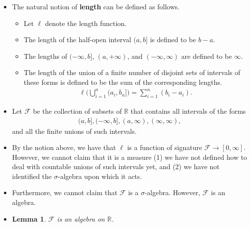 \documentclass[10pt]{article}
\newtheorem{lemma}{Lemma}
\newcommand{\mcal}[1]{\mathcal{#1}}
\newcommand{\Real}{\mathbb{R}}
\begin{document}
\begin{itemize}  
  \item The natural notion of {\bf length} can be defined as follows.
  \begin{itemize}
    \item Let $\ell$ denote the length function.
    \item The length of the half-open interval $(a,b]$ is defined to be $b - a$. 
    \item The lengths of $(-\infty, b]$, $(a, +\infty)$, and $(-\infty, \infty)$ are defined to be $\infty$.
    \item The length of the union of a finite number of disjoint sets of intervals of these forms is defined to be the sum of the corresponding lengths.
    \begin{align*}
      \ell \bigg( \bigcup_{i=1}^n (a_i, b_n] \bigg) = \sum_{i=1}^n (b_i - a_i).
    \end{align*}  
  \end{itemize}

  \item Let $\mcal{F}$ be the collection of subsets of $\Real$ that contains all intervals of the forms
  \begin{align}
    (a,b], (-\infty,b], (a,\infty), (\infty,\infty) \label{half-open-intervals-spec}, 
  \end{align} and all the finite unions of such intervals.  

  \item By the notion above, we have that $\ell$ is a function of signature $\mcal{F} \rightarrow [0,\infty]$. However, we cannot claim that it is a measure (1) we have not defined how to deal with countable unions of such intervals yet, and (2) we have not identified the $\sigma$-algebra upon which it acts.
  
  \item Furthermore, we cannot claim that $\mcal{F}$ is a $\sigma$-algebra. However, $\mcal{F}$ is an algebra.
  
  \item \begin{lemma} \label{lemma:f-is-algebra}
    $\mcal{F}$ is an algebra on $\Real$.
  \end{lemma}
  

\end{itemize}
\end{document}
